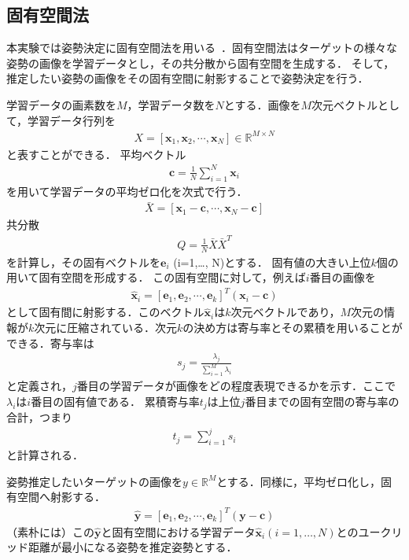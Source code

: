 \documentclass{article}
\begin{document}
\subsection{固有空間法}
本実験では姿勢決定に固有空間法を用いる~\cite{10.1299/jsmermd.2013._2p1-m08_1,10.2322/jjsass.64.253}．固有空間法はターゲットの様々な姿勢の画像を学習データとし，その共分散から固有空間を生成する．
そして，推定したい姿勢の画像をその固有空間に射影することで姿勢決定を行う．

学習データの画素数を$M$，学習データ数を$N$とする．画像を$M$次元ベクトルとして，学習データ行列を
\begin{align}
X = [\bm{x}_{1},\bm{x}_{2},\cdots,\bm{x}_{N}] \in \mathbb{R}^{M\times N}
\end{align}
と表すことができる．
平均ベクトル
\begin{align}
\bm{c}  = \frac{1}{N}\sum_{i=1}^{N} \bm{x}_{i}
\end{align}
を用いて学習データの平均ゼロ化を次式で行う．
\begin{align}
\bar{X} = [\bm{x}_{1}-\bm{c},\cdots, \bm{x}_{N}-\bm{c}]
\end{align}
共分散
\begin{align}
Q = \frac{1}{N}\bar{X}\bar{X}^{T}
\end{align}
を計算し，その固有ベクトルを$\bm{e}_{i}$ (i=1,\dots, N)とする．
固有値の大きい上位$k$個の用いて固有空間を形成する．
この固有空間に対して，例えば$i$番目の画像を
\begin{align}
\hat{\bm{x}}_{i} = [\bm{e}_{1},\bm{e}_{2},\cdots, \bm{e}_{k}]^{T} (\bm{x}_{i}- \bm{c})
\end{align}
として固有間に射影する．このベクトル$\hat{\bm{x}}_{i}$は$k$次元ベクトルであり，$M$次元の情報が$k$次元に圧縮されている．次元$k$の決め方は寄与率とその累積を用いることができる．寄与率は
\begin{align}
s_{j} = \frac{\lambda_{j}}{\sum_{i=1}^{M}\lambda_{i}}
\end{align}
と定義され，$j$番目の学習データが画像をどの程度表現できるかを示す．ここで$\lambda_{i}$は$i$番目の固有値である．
累積寄与率$t_{j}$は上位$j$番目までの固有空間の寄与率の合計，つまり
\begin{align}
t_{j} = \sum_{i=1}^{j}s_{i}
\end{align}
と計算される．

姿勢推定したいターゲットの画像を$y\in \mathbb{R}^{M}$とする．同様に，平均ゼロ化し，固有空間へ射影する．
\begin{align}
\hat{\bm{y}} = [\bm{e}_{1},\bm{e}_{2},\cdots, \bm{e}_{k}]^{T} (\bm{y}- \bm{c})
\end{align}
（素朴には）この$\hat{\bm{y}}$と固有空間における学習データ$\hat{\bm{x}}_{i}  (i=1,\dots, N)$とのユークリッド距離が最小になる姿勢を推定姿勢とする．
\end{document}
